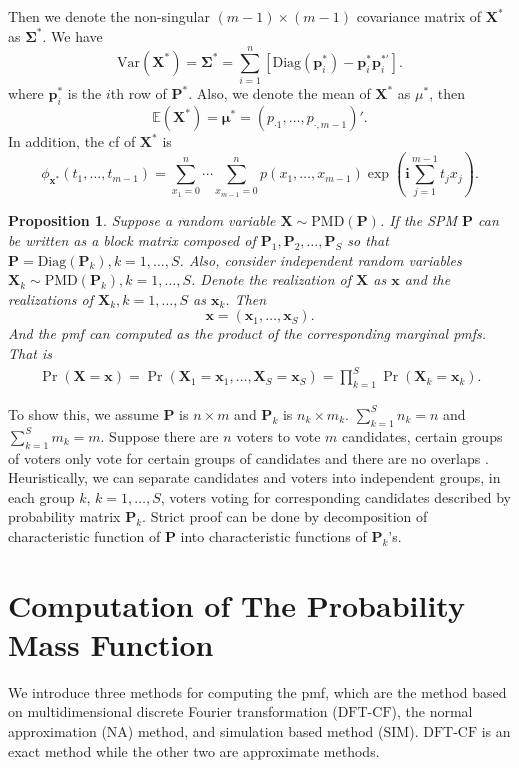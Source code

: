\documentclass[12pt]{article}
\newcommand{\Sigmavec}{{\boldsymbol{\Sigma}}}
\newcommand{\EE}{\mathbb{E}}
\newcommand{\Pmat}{\mathbf{P}}
\newcommand{\pvec}{\boldsymbol{p}}
\newcommand{\Var}{{\textrm{Var}}}
\newcommand{\ivec}{{\boldsymbol{i}}}
\newcommand{\diag}{\textrm{Diag}}
\newcommand{\PMD}{\textrm{PMD}}
\newcommand{\Xvec}{\boldsymbol{X}}
\newcommand{\xvec}{\boldsymbol{x}}
\newcommand{\muvec}{\boldsymbol{\mu}}
\newcommand{\Sig}{\boldsymbol{\Sigma}}
\newcommand{\SIM}{{\textrm{SIM}}}
\newcommand{\NA}{{\textrm{NA}}}
\newcommand{\dft}{{\textrm{DFT-CF}}}
\newcommand{\qedw}{\hfill \ensuremath{\Box}}
\newtheorem{ppt}{Proposition}
\begin{document}
Then we denote the non-singular $(m-1) \times (m-1)$ covariance matrix of $\Xvec^{\ast}$ as $\Sigmavec^{\ast}$. We have
 $$\Var(\Xvec^{\ast}) =\Sig^{\ast}=\sum_{i=1}^n[\diag(\pvec_i^{\ast})-\pvec_i^{\ast} \pvec_i^{\ast \prime} ].$$
where $\pvec_i^{\ast}$ is the $i$th row of $\Pmat^{\ast}$. Also, we denote the mean of $\Xvec^{\ast}$ as $\mu^{\ast}$, then
  $$\EE(\Xvec^{\ast}) =\muvec^{\ast} = \left( p_{\cdot1} ,\dots,p_{\cdot,m-1}\right)'.$$
 In addition, the cf of $\Xvec^{\ast}$ is 
 \begin{equation*}
\phi_{\xvec^{\ast}}(t_1, \dots, t_{m-1})  =  \sum_{x_1 = 0}^{n} \cdots \sum_{x_{m-1} = 0}^n p(x_1,\ldots,x_{m-1})\exp\left(\ivec\sum_{j=1}^{m-1}t_jx_j\right).
\end{equation*}
 
\begin{ppt}%
Suppose a random variable $\Xvec \sim \PMD(\Pmat)$. If the SPM $\Pmat$ can be written as a block matrix composed of $\Pmat_1, \Pmat_2, \dots, \Pmat_{S}$ so that $\Pmat = \diag(\Pmat_{k}), k=1,\dots,S$. Also, consider independent random variables $\Xvec_{k} \sim \PMD(\Pmat_{k}), k=1,\dots,S$. Denote the realization of $\Xvec$ as $\xvec$ and the realizations of $\Xvec_{k}, k=1,\dots,S$ as $\xvec_k$. Then 
$$\xvec= (\xvec_{1},\dots,\xvec_{S}).$$  
And the pmf can computed as the product of the corresponding marginal pmfs. That is
\begin{align*}
\Pr(\Xvec=\xvec)= \Pr(\Xvec_{1}=\xvec_{1}, \dots, \Xvec_{S}=\xvec_{S})= \prod_{k=1}^S \Pr(\Xvec_{k} = \xvec_{k}).
\end{align*}
\end{ppt}

To show this, we assume $\Pmat$ is $n \times m$ and $\Pmat_{k}$ is $n_k \times m_k$. $\sum_{k=1}^S n_k = n$ and $\sum_{k=1}^S m_k = m$. Suppose there are $n$ voters to vote $m$ candidates, certain groups of voters only vote for certain groups of candidates and there are no overlaps . Heuristically, we can separate candidates and voters into independent groups, in each group $k$, $k = 1,\dots,S$, voters voting for corresponding candidates described by probability matrix $\Pmat_{k}$. Strict proof can be done by decomposition of characteristic function of $\Pmat$ into characteristic functions of $\Pmat_{k}$'s.



\section{Computation of The Probability Mass Function} \label{sec:CA.driving.study}
We introduce three methods for computing the pmf, which are the method based on multidimensional discrete Fourier transformation ($\dft$), the normal approximation ($\NA$) method, and simulation based method ($\SIM$). $\dft$ is an exact method while the other two are approximate methods.
\end{document}

